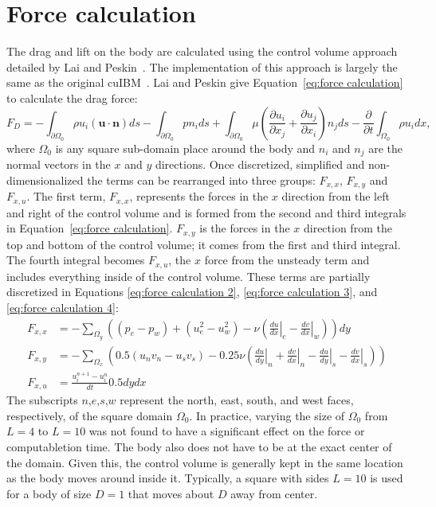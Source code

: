 \section{Force calculation}
\label{Force Calculation}

The drag and lift on the body are calculated using the control volume approach detailed by Lai and Peskin~\cite{lai2000immersed}.
The implementation of this approach is largely the same as the original cuIBM~\cite{layton2011cuibm}. 
Lai and Peskin give Equation~\eqref{eq:force calculation} to calculate the drag force:
\begin{equation}\label{eq:force calculation}
F_D=-\int_{\partial \Omega_0} \rho u_i(\textbf{u}\cdot \textbf{n})ds- \int_{\partial \Omega_0}pn_ids+\int_{\partial \Omega_0}\mu \left(\frac{\partial u_i}{\partial x_j}+\frac{\partial u_j}{\partial x_i}\right)n_jds-\frac{\partial}{\partial t}\int_{\Omega_0}\rho u_i dx,
\end{equation}
where $\Omega_0$ is any square sub-domain place around the body and $n_i$ and $n_j$ are the normal vectors in the $x$ and $y$ directions. 
Once discretized, simplified and non-dimensionalized the terms can be rearranged into three groups: $F_{x,x}$, $F_{x,y}$ and $F_{x,u}$. 
The first term, $F_{x,x}$, represents the forces in the $x$ direction from the left and right of the control volume and is formed from the second and third integrals in Equation~\eqref{eq:force calculation}. 
$F_{x,y}$ is the forces in the $x$ direction from the top and bottom of the control volume; it comes from the first and third integral. 
The fourth integral becomes $F_{x,u}$, the $x$ force from the unsteady term and includes everything inside of the control volume. 
These terms are partially discretized in Equations \eqref{eq:force calculation 2}, \eqref{eq:force calculation 3}, and \eqref{eq:force calculation 4}:
\begin{align}
F_{x,x} &=-\sum_{\Omega_y}\left((p_e-p_w)+(u_e^2-u_w^2)-\nu\left(\left.\frac{du}{dx}\right|_e-\left.\frac{dv}{dx}\right|_w\right)\right)dy\label{eq:force calculation 2}\\
F_{x,y} &=-\sum_{\Omega_x}\left(0.5(u_nv_n-u_sv_s)-0.25\nu \left(\left.\frac{du}{dy}\right|_n+\left.\frac{dv}{dx}\right|_n-\left.\frac{du}{dy}\right|_s-\left.\frac{dv}{dx}\right|_s\right)\right)\label{eq:force calculation 3}\\
F_{x,u} &=\frac{u_i^{n+1}-u_i^{n}}{dt}0.5dydx\;\label{eq:force calculation 4}
\end{align}
The subscripts $n$,$e$,$s$,$w$ represent the north, east, south, and west faces, respectively, of the square domain $\Omega_0$.
In practice, varying the size of $\Omega_0$ from $L=4$ to $L=10$ was not found to have a significant effect on the force or computabletion time.
The body also does not have to be at the exact center of the domain.
Given this, the control volume is generally kept in the same location as the body moves around inside it.
Typically, a square with sides $L=10$ is used for a body of size $D=1$ that moves about $D$ away from center.

